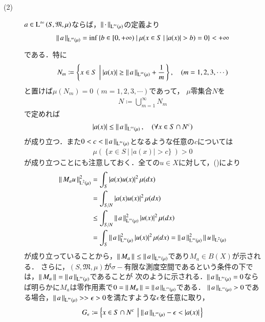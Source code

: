 \begin{prf}
\begin{description}
	\item[(2)] $a \in \operatorname{L}^{\infty} \left(S, \mathfrak{M}, \mu\right)$ならば，$\left\|\, \cdot\, \right\|_{\operatorname{L}^{\infty} \left(\mu\right)}$の定義より
		\begin{align}
			\left\|\, a\, \right\|_{\operatorname{L}^{\infty} \left(\mu\right)} = \operatorname*{inf}_{} \left\{b \in [0, +\infty)\ |\ \mu(x \in S\ |\ |a(x)| > b) = 0 \right\} < +\infty
		\end{align}
		である．特に
		\begin{align}
			N_m \coloneqq \left\{x \in S\ \left|\ |a(x)| \geq \left\|\, a\, \right\|_{\operatorname{L}^{\infty} \left(\mu\right)} + \frac{1}{m} \right.\right\}, \quad(m = 1,2,3,\cdots)
		\end{align}
		と置けば$\mu(N_m)=0\ (m=1,2,3,\cdots)$であって，
		$\mu$零集合$N$を
		\begin{align}
			N \coloneqq \bigcup_{m=1}^{\infty} N_m
		\end{align}
		で定めれば
		\begin{align}
			|a(x)| \leq \left\|\, a\, \right\|_{\operatorname{L}^{\infty} \left(\mu\right)}, \quad (\forall x \in S \cap N^c) \label{eq:func_analy_Q9}
		\end{align}
		が成り立つ．また$0 < c < \left\|\, a\, \right\|_{\operatorname{L}^{\infty} \left(\mu\right)}$となるような任意の$c$については
		\begin{align}
			\mu(\ \{x \in S\ |\ |a(x)| > c\}\ ) > 0 \label{eq:func_analy_Linfty}
		\end{align}
		が成り立つことにも注意しておく．全ての$u \in X$に対して，()により
		\begin{align}
			\left\|\, M_a u\, \right\|_{\operatorname{L}^{2} \left(\mu\right)}^2 
			&= \int_{S} |a(x)u(x)|^2\, \mu(dx) \\
			&= \int_{S/N} |a(x)u(x)|^2\, \mu(dx) \\
			&\leq \int_{S/N} \left\|\, a\, \right\|_{\operatorname{L}^{\infty} \left(\mu\right)}^2|u(x)|^2\, \mu(dx) \\
			&= \int_{S} \left\|\, a\, \right\|_{\operatorname{L}^{\infty} \left(\mu\right)}^2|u(x)|^2\, \mu(dx)
			= \left\|\, a\, \right\|_{\operatorname{L}^{\infty} \left(\mu\right)}^2 \left\|\, u\, \right\|_{\operatorname{L}^{2} \left(\mu\right)}
		\end{align}
		が成り立っていることから，$\left\|\, M_a\, \right\|_{} \leq \left\|\, a\, \right\|_{\operatorname{L}^{\infty} \left(\mu\right)}$であり$M_a \in B(X)$が示される．
		さらに，$(S, \mathfrak{M}, \mu)$が$\sigma-$有限な測度空間であるという条件の下では，$\left\|\, M_a\, \right\|_{} = \left\|\, a\, \right\|_{\operatorname{L}^{\infty} \left(\mu\right)}$であることが
		次のように示される．$\left\|\, a\, \right\|_{\operatorname{L}^{\infty} \left(\mu\right)} = 0$ならば明らかに$M_a$は零作用素で$0 = \left\|\, M_a\, \right\|_{} = \left\|\, a\, \right\|_{\operatorname{L}^{\infty} \left(\mu\right)}$である．
		$\left\|\, a\, \right\|_{\operatorname{L}^{\infty} \left(\mu\right)} > 0$である場合，$\left\|\, a\, \right\|_{\operatorname{L}^{\infty} \left(\mu\right)} >> \epsilon > 0$を満たすような$\epsilon$を任意に取り，
		\begin{align}
			G_\epsilon \coloneqq \left\{ x \in S \cap N^c\ \left|\ \Norm{a}{\Lp{\infty}{\mu}} - \epsilon < |a(x)| \right.\right\}

\end{align}
\end{description}
\end{prf}
